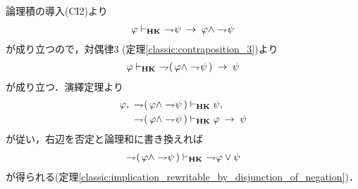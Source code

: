 	\begin{sketch}
		論理積の導入(CI2)より
		\begin{align}
			\varphi \vdash_{{\scriptsize \mbox{{\bf HK}}}}\ \rightharpoondown\hspace{-0.25em} \psi
			\hspace{0.25em}\rightarrow\hspace{0.25em} \varphi \wedge \rightharpoondown\hspace{-0.25em} \psi
		\end{align}
		が成り立つので，対偶律3 (定理\ref{classic:contraposition_3})より
		\begin{align}
			\varphi \provable{\mbox{{\bf HK}}}\ 
			\negation (\, \varphi \wedge \negation \psi\, ) \rarrow \psi
		\end{align}
		が成り立つ．演繹定理より
		\begin{align}
			\varphi,\ \rightharpoondown\hspace{-0.25em} (\, \varphi \wedge \rightharpoondown\hspace{-0.25em} \psi\, ) 
			&\vdash_{{\scriptsize \mbox{{\bf HK}}}} \psi, \\
			\rightharpoondown\hspace{-0.25em} (\, \varphi \wedge \rightharpoondown\hspace{-0.25em} \psi\, ) 
			&\vdash_{{\scriptsize \mbox{{\bf HK}}}} \varphi \hspace{0.25em}\rightarrow\hspace{0.25em} \psi
		\end{align}
		が従い，右辺を否定と論理和に書き換えれば
		\begin{align}
			\rightharpoondown\hspace{-0.25em} (\, \varphi \wedge \rightharpoondown\hspace{-0.25em} \psi\, ) 
			\vdash_{{\scriptsize \mbox{{\bf HK}}}}\ \rightharpoondown\hspace{-0.25em} \varphi \vee \psi
		\end{align}
		が得られる(定理\ref{classic:implication_rewritable_by_disjunction_of_negation})．
		\QED
	\end{sketch}
	
